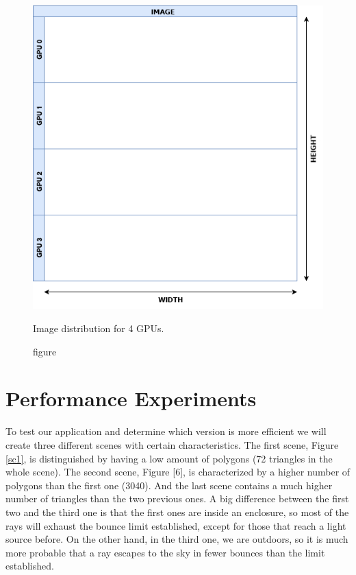 \documentclass[titlepage,12pt]{report}
\begin{document}
\begin{figure}[H]
	\centering
	\includegraphics[scale=0.50]{media/divideAndConquer.png}
	\caption{figure}{Image distribution for 4 GPUs.}
	\label{distribution}
\end{figure}

\chapter{Performance Experiments}

To test our application and determine which version is more efficient we will create three different scenes with certain characteristics. The first scene, Figure \ref{sc1}, is distinguished by having a low amount of polygons (72 triangles in the whole scene). The second scene, Figure [6], is characterized by a higher number of polygons than the first one (3040). And the last scene contains a much higher number of triangles than the two previous ones. A big difference between the first two and the third one is that the first ones are inside an enclosure, so most of the rays will exhaust the bounce limit established, except for those that reach a light source before. On the other hand, in the third one, we are outdoors, so it is much more probable that a ray escapes to the sky in fewer bounces than the limit established.
\end{document}
